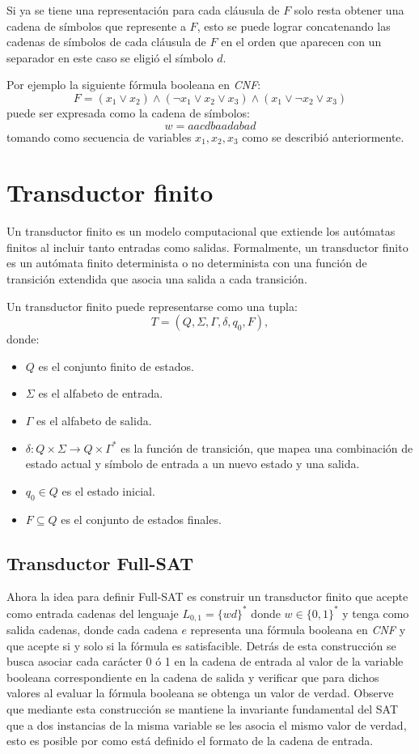 \documentclass{book}
\begin{document}
Si ya se tiene una representación para cada cláusula de $F$ solo resta obtener una cadena de símbolos que represente a $F$,
esto se puede lograr concatenando las cadenas de símbolos de cada cláusula de $F$ en el orden que aparecen con un separador
en este caso se eligió el símbolo $d$.

Por ejemplo la siguiente fórmula booleana en \textit{CNF}:
$$F=(x_1 \vee x_2) \wedge (\neg x_1 \vee x_2 \vee x_3) \wedge (x_1 \vee \neg x_2 \vee x_3)$$
puede ser expresada como la cadena de símbolos:
$$w=aacdbaadabad$$
tomando como secuencia de variables $x_1, x_2, x_3$ como se describió anteriormente.

\section{Transductor finito}

Un transductor finito es un modelo computacional que extiende los autómatas finitos al incluir tanto entradas como salidas.
Formalmente, un transductor finito es un autómata finito determinista o no determinista con una función de transición extendida
que asocia una salida a cada transición.

Un transductor finito puede representarse como una tupla:
\[
    T = (Q, \Sigma, \Gamma, \delta, q_0, F),
\]
donde:
\begin{itemize}
    \item \(Q\) es el conjunto finito de estados.
    \item \(\Sigma\) es el alfabeto de entrada.
    \item \(\Gamma\) es el alfabeto de salida.
    \item \(\delta: Q \times \Sigma \to Q \times \Gamma^*\) es la función de transición, que mapea una combinación de estado actual y símbolo de entrada a un nuevo estado y una salida.
    \item \(q_0 \in Q\) es el estado inicial.
    \item \(F \subseteq Q\) es el conjunto de estados finales.
\end{itemize}

\subsection{Transductor Full-SAT}

Ahora la idea para definir Full-SAT es construir un transductor finito que acepte como entrada cadenas del lenguaje $L_{0,1}=\{wd\}^*$ donde $w\in \{0,1\}^*$
y tenga como salida cadenas, donde cada cadena $e$ representa una fórmula booleana en \textit{CNF} y que acepte si y solo si la fórmula es satisfacible. Detrás
de esta construcción se busca asociar cada carácter 0 ó 1 en la cadena de entrada al valor de la variable booleana correspondiente en la cadena de salida y verificar que para dichos
valores al evaluar la fórmula booleana se obtenga un valor de verdad. Observe que mediante esta construcción se mantiene la invariante fundamental del SAT que a dos instancias
de la misma variable se les asocia el mismo valor de verdad, esto es posible por como está definido el formato de la cadena de entrada.
\end{document}

